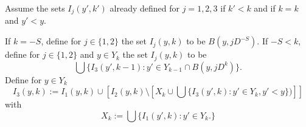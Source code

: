 Assume the sets ${I}_j(y',k')$ already defined  for $j=1,2,3$ if $k'<k$ and if  $k=k$ and $y'<y$.




If $k=-S$, define for  $j\in \{1,2\}$ the set
${I}_j(y,k)$ to be $B(y,jD^{-S})$.
If $-S<k$, define for $j\in \{1,2\}$
and $y\in Y_k$ the set ${I}_j(y,k)$ to be
\begin{equation}\label{defineij}
\bigcup\{I_3(y',k-1):
y'\in Y_{k-1}\cap  B(y,jD^k)\}.
\end{equation}
Define for $y\in Y_k$
\begin{equation}\label{definei3}
I_3(y,k):={I_1}(y,k)\cup \left[{I_2}(y,k)\setminus \left[X_k\cup \bigcup\{I_3(y',k):y'\in Y_{k}, y'<y\})\right]\right]
\end{equation}
with
\begin{equation}
        X_{k}:=\bigcup\{I_1(y', k):y'\in Y_{k} .\}
\end{equation}


